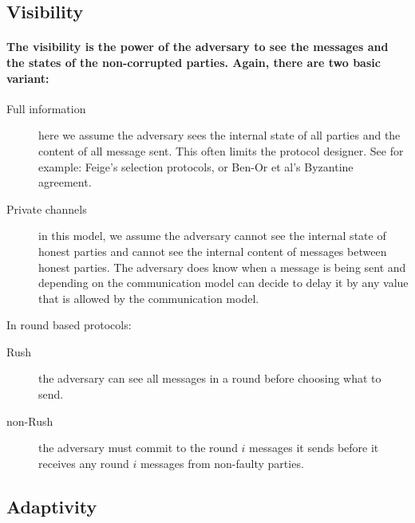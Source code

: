 \subsection{Visibility}

\paragraph{The visibility is the power of the adversary to see the messages
and the states of the non-corrupted parties. Again, there are two
basic variant:}
\begin{description}
\item [{Full$\,\,$information}] here we assume the adversary sees the
internal state of all parties and the content of all message sent.
This often limits the protocol designer. See for example: Feige\textquoteright s
selection protocols, or Ben-Or et al\textquoteright s Byzantine agreement. 
\item [{Private$\,\,$channels}] in this model, we assume the adversary
cannot see the internal state of honest parties and cannot see the
internal content of messages between honest parties. The adversary
does know when a message is being sent and depending on the communication
model can decide to delay it by any value that is allowed by the communication
model.
\end{description}
In round based protocols:
\begin{description}
\item [{Rush}] the adversary can see all messages in a round before choosing
what to send.
\item [{non-Rush}] the adversary must commit to the round $i$ messages
it sends before it receives any round $i$ messages from non-faulty
parties.
\end{description}

\subsection{Adaptivity }

